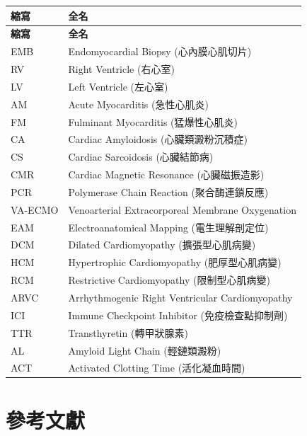 \documentclass[12pt,a4paper]{article}
\begin{document}
\begin{longtable}{p{3cm}p{11cm}}
\toprule
\textbf{縮寫} & \textbf{全名} \\
\midrule
\endfirsthead

\toprule
\textbf{縮寫} & \textbf{全名} \\
\midrule
\endhead

\bottomrule
\endfoot

EMB & Endomyocardial Biopsy (心內膜心肌切片) \\
RV & Right Ventricle (右心室) \\
LV & Left Ventricle (左心室) \\
AM & Acute Myocarditis (急性心肌炎) \\
FM & Fulminant Myocarditis (猛爆性心肌炎) \\
CA & Cardiac Amyloidosis (心臟類澱粉沉積症) \\
CS & Cardiac Sarcoidosis (心臟結節病) \\
CMR & Cardiac Magnetic Resonance (心臟磁振造影) \\
PCR & Polymerase Chain Reaction (聚合酶連鎖反應) \\
VA-ECMO & Venoarterial Extracorporeal Membrane Oxygenation \\
EAM & Electroanatomical Mapping (電生理解剖定位) \\
DCM & Dilated Cardiomyopathy (擴張型心肌病變) \\
HCM & Hypertrophic Cardiomyopathy (肥厚型心肌病變) \\
RCM & Restrictive Cardiomyopathy (限制型心肌病變) \\
ARVC & Arrhythmogenic Right Ventricular Cardiomyopathy \\
ICI & Immune Checkpoint Inhibitor (免疫檢查點抑制劑) \\
TTR & Transthyretin (轉甲狀腺素) \\
AL & Amyloid Light Chain (輕鏈類澱粉) \\
ACT & Activated Clotting Time (活化凝血時間) \\
\bottomrule
\end{longtable}

\section{參考文獻}
\end{document}
